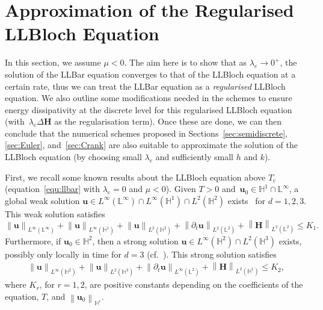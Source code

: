 \documentclass[11pt, reqno]{amsart}
\theoremstyle{definition}
\theoremstyle{remark}
\numberwithin{equation}{section}
\newcommand{\bff}{\boldsymbol}
\newcommand{\bb}{\mathbb}
\newcommand{\norm}[2]{\left\|{#1}\right\|_{#2}}
\begin{document}
\section{Approximation of the Regularised LLBloch Equation}\label{sec:bloch}

In this section, we assume $\mu<0$. The aim here is to show that as $\lambda_e \to 0^+$, the solution of the LLBar equation converges to that of the LLBloch equation at a certain rate, thus we can treat the LLBar equation as a \emph{regularised} LLBloch equation. We also outline some modifications needed in the schemes to ensure energy dissipativity at the discrete level for this regularised LLBloch equation (with~$\lambda_e \Delta \bff{H}$ as the regularisation term). Once these are done, we can then conclude that the numerical schemes proposed in Sections~\ref{sec:semidiscrete}, \ref{sec:Euler}, and~\ref{sec:Crank} are also suitable to approximate the solution of the LLBloch equation (by choosing small $\lambda_e$ and sufficiently small $h$ and $k$).

First, we recall some known results about the LLBloch equation above $T_\mathrm{c}$ (equation~\eqref{equ:llbar} with $\lambda_e=0$ and $\mu<0$).
Given $T>0$ and~$\bff{u}_0\in \bb{H}^1 \cap \bb{L}^\infty$, a global weak solution $\bff{u}\in L^\infty(\bb{L}^\infty)\cap L^\infty(\bb{H}^1) \cap L^2(\bb{H}^2)$ exists~\cite{Le16, LeSoeTra24} for $d=1,2,3$. This weak solution satisfies
\begin{equation*}
	\norm{\bff{u}}{L^\infty(\bb{L}^\infty)} + 
	\norm{\bff{u}}{L^\infty(\bb{H}^1)} +
	\norm{\bff{u}}{L^2(\bb{H}^2)} +
	\norm{\partial_t \bff{u}}{L^2(\bb{L}^2)} + 
	\norm{\bff{H}}{L^2(\bb{L}^2)} \leq K_1.
\end{equation*}
Furthermore, if $\bff{u}_0\in \bb{H}^2$, then a strong solution $\bff{u}\in L^\infty(\bb{H}^2)\cap L^2(\bb{H}^3)$ exists, possibly only locally in time for $d=3$ (cf.~\cite{LeSoeTra24}). This strong solution satisfies
\begin{align}\label{equ:u H bloch H2}
	\norm{\bff{u}}{L^\infty(\bb{H}^2)} + \norm{\bff{u}}{L^2(\bb{H}^3)} +
	\norm{\partial_t \bff{u}}{L^\infty(\bb{L}^2)} + \norm{\bff{H}}{L^2(\bb{H}^1)} \leq K_2,
\end{align}
where $K_r$, for $r=1,2$, are positive constants depending on the coefficients of the equation, $T$, and $\norm{\bff{u}_0}{\bb{H}^r}$.
\end{document}
